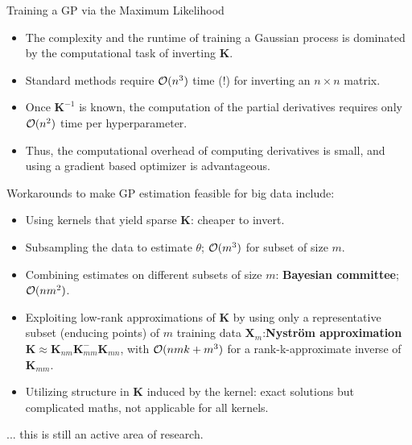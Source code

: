 \begin{frame}[c,allowframebreaks]{Training a GP via the Maximum Likelihood}
\begin{itemize}
  \item The complexity and the runtime of training a Gaussian process is dominated by the computational task of inverting $\bm{K}$.
  \lz
  \item Standard methods require $\mathcal{O}(n^3)$ time (!) for inverting an $n\times n$ matrix.
  \lz
  \item Once $\bm{K}^{-1}$ is known, the computation of the partial derivatives requires only $\mathcal{O}(n^2)$ time per hyperparameter.
  \lz
  \item[\faLightbulbO] Thus, the computational overhead of computing derivatives is small, and using a gradient based optimizer is advantageous. 
\end{itemize}


\framebreak
Workarounds to make GP estimation feasible for big data include:

\begin{itemize}
\item Using kernels that yield sparse $\bm K$: cheaper to invert.
\vspace{3mm}
\item Subsampling the data to estimate $\theta$; $\mathcal{O}(m^3)$ for subset of size $m$.
\vspace{3mm}
\item Combining estimates on different subsets of size $m$: \textbf{Bayesian committee}; $\mathcal{O}(n m^2)$.
\vspace{3mm}
\item Exploiting low-rank approximations of $\bm{K}$ by using only a representative subset (enducing points) of $m$ training data $\bm X_m$:\textbf{Nyström approximation} $\bm K\approx\bm K_{nm} \bm K_{mm}^{-} \bm K_{mn}$, with $\mathcal{O}(nmk + m^3)$ for a rank-k-approximate inverse of $\bm K_{mm}$.
\vspace{3mm}
\item Utilizing structure in $\bm{K}$ induced by the kernel: exact solutions but complicated maths, not applicable for all kernels.
\end{itemize}

\vspace{3mm}
... this is still an active area of research.




\end{frame}


